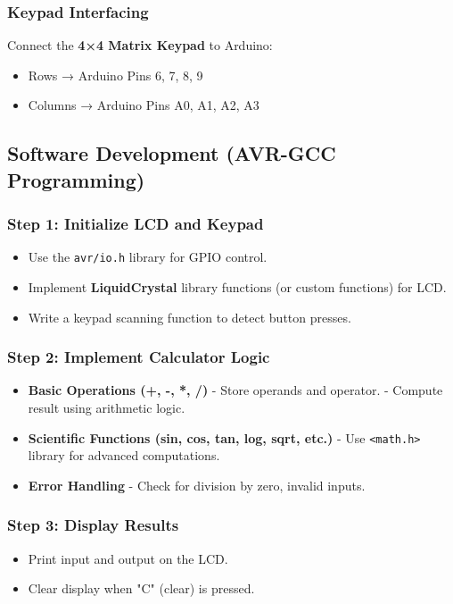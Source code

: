 \documentclass[12pt,a4paper]{article}
\begin{document}
\subsubsection{Keypad Interfacing}
Connect the \textbf{4×4 Matrix Keypad} to Arduino:
\begin{itemize}
    \item Rows → Arduino Pins 6, 7, 8, 9
    \item Columns → Arduino Pins A0, A1, A2, A3
\end{itemize}

\subsection{Software Development (AVR-GCC Programming)}
\subsubsection{Step 1: Initialize LCD and Keypad}
\begin{itemize}
    \item Use the \texttt{avr/io.h} library for GPIO control.
    \item Implement \textbf{LiquidCrystal} library functions (or custom functions) for LCD.
    \item Write a keypad scanning function to detect button presses.
\end{itemize}

\subsubsection{Step 2: Implement Calculator Logic}
\begin{itemize}
    \item \textbf{Basic Operations (+, -, *, /)}  
        - Store operands and operator.  
        - Compute result using arithmetic logic.  
    \item \textbf{Scientific Functions (sin, cos, tan, log, sqrt, etc.)}  
        - Use \texttt{<math.h>} library for advanced computations.  
    \item \textbf{Error Handling}  
        - Check for division by zero, invalid inputs.  
\end{itemize}

\subsubsection*{Step 3: Display Results}
\begin{itemize}
    \item Print input and output on the LCD.
    \item Clear display when "C" (clear) is pressed.
\end{itemize}
\end{document}
